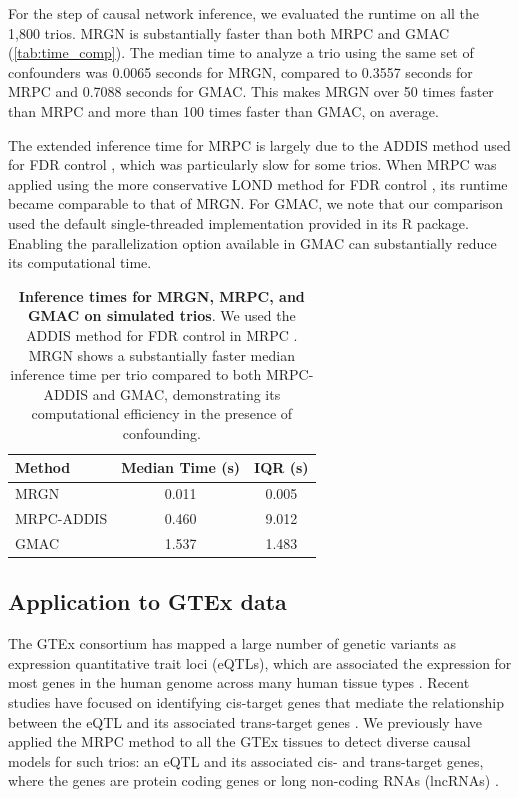 \documentclass[12pt,letterpaper]{report}
\begin{document}
\begin{doublespace}
For the step of causal network inference, we evaluated the runtime on all the 1,800 trios.  MRGN is substantially faster than both MRPC and GMAC (\autoref{tab:time_comp}). The median time to analyze a trio using the same set of confounders was 0.0065 seconds for MRGN, compared to 0.3557 seconds for MRPC and 0.7088 seconds for GMAC. This makes MRGN over 50 times faster than MRPC and more than 100 times faster than GMAC, on average.

The extended inference time for MRPC is largely due to the ADDIS method used for FDR control \cite{kvamme2025cistrans}, which was particularly slow for some trios. When MRPC was applied using the more conservative LOND method for FDR control \cite{badsha2019learning}, its runtime became comparable to that of MRGN. For GMAC, we note that our comparison used the default single-threaded implementation provided in its R package. Enabling the parallelization option available in GMAC can substantially reduce its computational time.

\begin{table}[H]
	\caption{\textbf{Inference times for MRGN, MRPC, and GMAC on simulated trios}. We used the ADDIS method for FDR control in MRPC \cite{kvamme2025cistrans}. MRGN shows a substantially faster median inference time per trio compared to both MRPC-ADDIS and GMAC, demonstrating its computational efficiency in the presence of confounding.}
	\label{tab:time_comp}
	\centering
	\begin{tabular}{lcc}
		\toprule
		\textbf{Method} & \textbf{Median Time (s)} & \textbf{IQR (s)} \\
		\midrule
		MRGN & 0.011 & 0.005 \\
		MRPC-ADDIS & 0.460 & 9.012 \\
		GMAC & 1.537 & 1.483 \\
		\bottomrule
	\end{tabular}
\end{table}





\subsection{Application to GTEx data}

The GTEx consortium has mapped a large number of genetic variants as expression quantitative trait loci (eQTLs), which are associated the expression for most genes in the human genome across many human tissue types \cite{gtex2020}. Recent  studies have focused on identifying cis-target genes that mediate the relationship between the eQTL and its associated trans-target genes \cite{yang2017identifying}.  We previously have applied the MRPC method to all the GTEx tissues to detect diverse causal models for such trios: an eQTL and its associated cis- and trans-target genes, where the genes are protein coding genes or long non-coding RNAs (lncRNAs) \cite{kvamme2025cistrans}.  


\end{doublespace}
\end{document}
